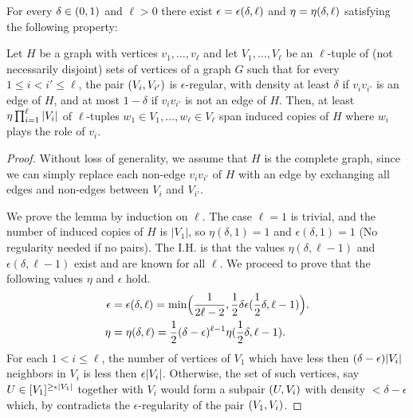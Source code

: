         \begin{lemma} \label{lem:H_like_partition_implies_H_abundance}
            For every $\delta \in ( 0, 1 )$ and $\ell > 0$ there exist $\epsilon = \epsilon ( \delta, \ell )$ and
            $\eta = \eta ( \delta, \ell )$ satisfying the following property:

            Let $H$ be a graph with vertices $v_1, \dots,v_\ell$ and let $V_1, \dots, V_\ell$ be an $\ell$-tuple of (not necessarily disjoint)
            sets of vertices of a graph $G$ such that for every $1 \leq i < i' \leq \ell$, the pair $( V_i, V_{i'} )$
            is $\epsilon$-regular, with density at least $\delta$ if $v_i v_{i'}$ is an edge of $H$, and at most $1 - \delta$
            if $v_i v_{i'}$ is not an edge of $H$.
            Then, at least $\eta \prod_{i=1}^\ell | V_i |$ of $\ell$-tuples $w_1 \in V_1, \dots, w_\ell \in V_\ell$
            span induced copies of $H$ where $w_i$ plays the role of $v_i$.
            \begin{proof}
                Without loss of generality, we assume that $H$ is the complete graph, since we can simply replace each non-edge
                $v_i v_{i'}$ of $H$ with an edge by exchanging all edges and non-edges between $V_i$ and $V_{i'}$.

                We prove the lemma by induction on $\ell$.
                The case $\ell=1$ is trivial, and the number of induced copies of $H$ is $|V_1|$, so $\eta(\delta, 1) = 1$ and
                $\epsilon(\delta, 1) = 1$ (No regularity needed if no pairs).
                The I.H. is that the values $\eta(\delta, \ell-1)$ and $\epsilon(\delta, \ell-1)$ exist and are known for all
                $\ell$.
                We proceed to prove that the following values $\eta$ and $\epsilon$ hold.
                \begin{align*}
                    \epsilon &= \epsilon(\delta, \ell)
                        = \min \Bigl( \frac{1}{2\ell - 2}, \frac{1}{2} \delta \epsilon(\frac{1}{2}\delta, \ell-1) \Bigr). \\
                    \eta &= \eta(\delta, \ell)
                        = \frac{1}{2} (\delta - \epsilon)^{\ell-1} \eta(\frac{1}{2}\delta, \ell-1).
                \end{align*}
                For each $1 < i \leq \ell$, the number of vertices of $V_1$ which have less then
                $(\delta - \epsilon) | V_i |$ neighbors in $V_i$ is less then $\epsilon | V_i |$.
                Otherwise, the set of such vertices, say $U \in [V_1]^{\geq \epsilon | V_1 |}$ together with $V_i$
                would form a subpair $( U, V_i )$ with density $< \delta - \epsilon$ which, by
                 contradicts the $\epsilon$-regularity of the pair $( V_1, V_i )$.


\end{proof}
\end{lemma}
